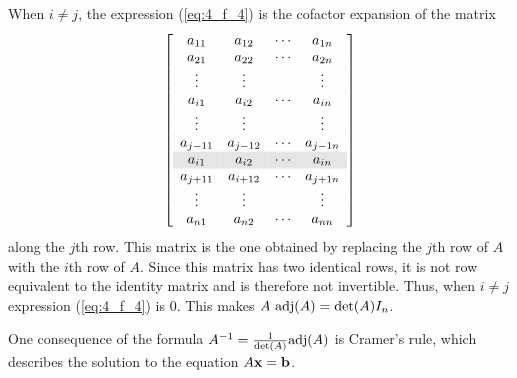 When $i \neq j$, the expression (\ref{eq:4_f_4}) is the cofactor expansion of the matrix
\[\left[ \begin{array}{cccc}
a_{11} 		& a_{12} 	& \cdots   & a_{1n} \\
a_{21} 		&a_{22}		& \cdots  & a_{2n} \\
\vdots 		& \vdots      &           &\vdots  \\
a_{i1}  		&a_{i2} 		& \cdots   & a_{in} \\
\vdots 		& \vdots      &           &\vdots  \\
a_{j-11}  		&a_{j-12} 		& \cdots   & a_{j-1n} \\
\rowcolor{Gray}
a_{i1}  		&a_{i2} 		& \cdots   & a_{in} \\
a_{j+11}  		&a_{i+12} 		& \cdots   & a_{j+1n} \\
\vdots 		& \vdots      &           &\vdots  \\
a_{n1} 		& a_{n2} 	& \cdots   &a_{nn}
\end{array} \right]\]
along the $j$th row. This matrix is the one obtained by replacing the $j$th row of $A$ with the $i$th row of $A$. Since this matrix has two identical rows, it is not row equivalent to the identity matrix and is therefore not invertible. Thus, when $i \neq j$ expression (\ref{eq:4_f_4}) is 0. This makes $A \ \text{adj}(A) = \det(A) I_n$.

One consequence of the formula $A^{-1} = \frac{1}{\det(A)} \text{adj}(A)$ is Cramer's rule, which describes the solution to the equation $A \mathbf{x} = \mathbf{b}$. 



